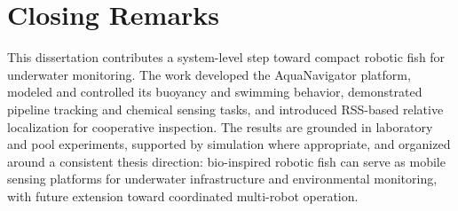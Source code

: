 \documentclass{uhcoethesis}
\begin{document}
\section{Closing Remarks}

This dissertation contributes a system-level step toward compact robotic fish for underwater monitoring. The work developed the AquaNavigator platform, modeled and controlled its buoyancy and swimming behavior, demonstrated pipeline tracking and chemical sensing tasks, and introduced RSS-based relative localization for cooperative inspection. The results are grounded in laboratory and pool experiments, supported by simulation where appropriate, and organized around a consistent thesis direction: bio-inspired robotic fish can serve as mobile sensing platforms for underwater infrastructure and environmental monitoring, with future extension toward coordinated multi-robot operation.

\backmatter

 \nocite{*}


\end{document}
